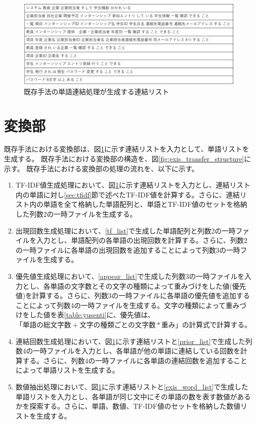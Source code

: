 \begin{figure}[tp]
    \begin{center}
        \includegraphics[width=1.0\columnwidth]{image/exis_connect_list.png}
        \caption{既存手法の単語連結処理が生成する連結リスト}
        \label{fig:exis_connect_list}
    \end{center}
\end{figure}

\section{変換部}
\label{sec:exis_transfer}
既存手法における変換部は、図\ref{fig:exis_connect_list}に示す連結リストを入力として、単語リストを生成する。
既存手法における変換部の構造を、図\ref{fig:exis_transfer_structure}に示す。
既存手法における変換部の処理の流れを、以下に示す。

\begin{enumerate}
    \item TF-IDF値生成処理において、図\ref{fig:exis_connect_list}に示す連結リストを入力とし、連結リスト内の単語に対し\ref{sec:tfidf}節で述べたTF-IDF値を計算する。さらに、連結リスト内の単語を全て格納した単語配列と、単語とTF-IDF値のセットを格納した列数2の一時ファイルを生成する。
    \label{tf_list}
    \item 出現回数生成処理において、\ref{tf_list}で生成した単語配列と列数2の一時ファイルを入力とし、単語配列の各単語の出現回数を計算する。さらに、列数2の一時ファイルに各単語の出現回数を追加することによって列数3の一時ファイルを生成する。
    \label{appear_list}
    \item 優先値生成処理において、\ref{appear_list}で生成した列数3の一時ファイルを入力とし、各単語の文字数とその文字の種類によって重みづけをした値(優先値)を計算する。さらに、列数3の一時ファイルに各単語の優先値を追加することによって列数4の一時ファイルを生成する。文字の種類によって重みづけをした値を表\ref{table:yusenti}に、優先値は、$「単語の総文字数 + 文字の種類ごとの文字数 * 重み」$の計算式で計算する。
    \label{prior_list}
    \item 連結回数生成処理において、図\ref{fig:exis_connect_list}に示す連結リストと\ref{prior_list}で生成した列数4の一時ファイルを入力とし、各単語が他の単語に連結している回数を計算する。さらに、列数4の一時ファイルに各単語の連結回数を追加することによって単語リストを生成する。
    \label{exis_word_list}
    \item 数値抽出処理において、図\ref{fig:exis_connect_list}に示す連結リストと\ref{exis_word_list}で生成した単語リストを入力とし、各単語が同じ文中にその単語の数を表す数値があるかを探索する。さらに、単語、数値、TF-IDF値のセットを格納した数値リストを生成する。
\end{enumerate}


